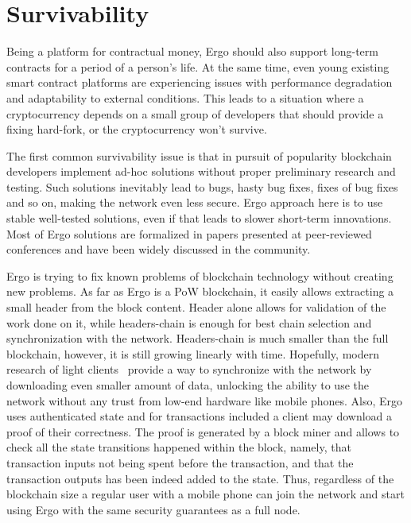 \section{Survivability}
\label{sec:survivability}



Being a platform for contractual money, Ergo should also support long-term contracts for a
period of a person's life.
At the same time, even young existing smart contract platforms are experiencing issues with performance degradation and
adaptability to external conditions.
This leads to a situation where a cryptocurrency depends on a small group of developers
that should provide a fixing hard-fork, or the cryptocurrency won't survive.

The first common survivability issue is that in pursuit of popularity blockchain developers implement ad-hoc
solutions without proper preliminary research and testing.
Such solutions inevitably lead to bugs, hasty bug fixes, fixes of bug fixes and so on, making the network even less secure.
Ergo approach here is to use stable well-tested solutions, even if that leads to slower
short-term innovations.
Most of Ergo solutions are formalized in papers presented at peer-reviewed conferences
and have been widely discussed in the community.

Ergo is trying to fix known problems of blockchain technology without creating new problems.
As far as Ergo is a PoW blockchain, it easily allows extracting a small header from the block content.
Header alone allows for validation of the work done on it, while headers-chain is enough for best chain selection
and synchronization with the network.
Headers-chain is much smaller than the full blockchain, however, it is still growing linearly with time.
Hopefully, modern research of light clients~\cite{kiayias2017non,luuflyclient} provide a way to
synchronize with the network by downloading even smaller amount of data, unlocking the ability to
use the network without any trust from low-end hardware like mobile phones.
Also, Ergo uses authenticated state\cite{reyzin2017improving} and for transactions included
a client may download a proof of their correctness.
The proof is generated by a block miner and allows to check all the state transitions happened within the block, namely,
that transaction inputs not being spent before the transaction, and that the
transaction outputs has been indeed added to the state.
Thus, regardless of the blockchain size a regular user with
a mobile phone can join the network and start using Ergo with the same security
guarantees as a full node. 


